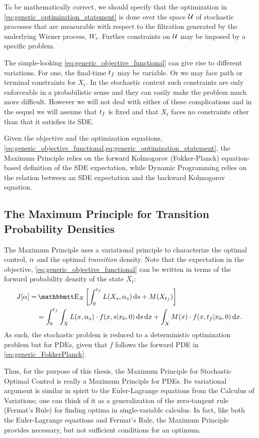 To be mathematically correct, we should specify that the optimization in
\cref{eq:generic_optimization_statement} is done over the space ${ \mathcal{U} }$ of
stochastic processes that are measurable with respect to the filtration
generated by the underlying Wiener process, $W_t$. Further constraints on
${ \mathcal{U} }$ may be imposed by a specific problem.

The simple-looking \cref{eq:generic_objective_functional} can give rise to
different variations. For one, the final-time ${ t_f }$ may be variable. Or we may
face path or terminal constraints for $X_t$. In the stochastic context such
constraints are only enforceable in a probabilistic sense and they can easily
make the problem much more difficult. However we will not deal with either of
these complications and in the sequel we will assume that ${ t_f }$ is fixed and
that $X_t$ faces no constraints other than that it satisfies its SDE.

Given the objective and the optimization equations,
\cref{eq:generic_objective_functional,eq:generic_optimization_statement}, the
Maximum Principle relies on the forward Kolmogorov (Fokker-Planck)
equation-based definition of the SDE expectation, while Dynamic Programming
relies on the relation between an SDE expectation and the backward Kolmogorov
equation.


\subsection{The Maximum Principle for Transition Probability Densities}
\label{sec:maximum_principle_4_stochastic_control}
The Maximum Principle uses a variational principle to characterize the optimal
control, $\alpha$ and the optimal {\sl transition } density. Note that the
expectation in the objective, \cref{eq:generic_objective_functional} can be written in terms of the forward
probability density of the state $X_t$:
\begin{align}
J[\a] =&  \Exp_X \left[ \int_0^\tf L(X_s, \a_s) \intd{s} + M(X_\tf) \right]
\notag \\
&=  \int_0^\tf\int_X L(x, \a_s) \cdot f(x,s|x_0,0) \intd{s}\intd{x} 
+ \int_X  M(x)\cdot f(x,\tf|x_0,0)\intd{x}.
\label{eq:generic_objective_functional_in_terms_of_forward_density}
\end{align}
As such, the stochastic problem is reduced to a deterministic optimization
problem but for PDEs, given that $f$ follows the forward PDE in
\cref{eq:generic_FokkerPlanck}. 

Thus, for the purpose of this thesis, the Maximum Principle for Stochastic Optimal
Control is really a Maximum Principle for PDEs. Its variational argument is
similar in spirit to the Euler-Lagrange equations from the Calculus of
Variations; one can think of it as a generalization of the zero-tangent
rule (Fermat's Rule) for finding optima in single-variable calculus. In fact,
like both the Euler-Lagrange equations and Fermat's Rule, the Maximum Principle
provides necessary, but not sufficient conditions for an optimum.


